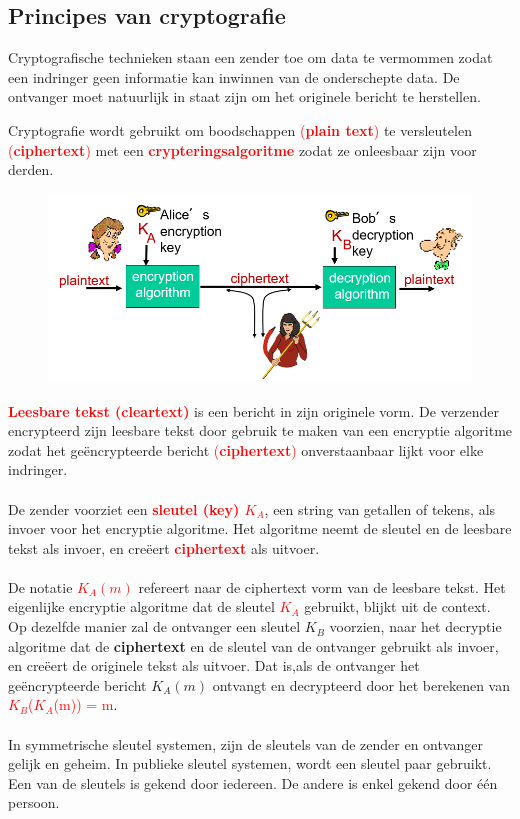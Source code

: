 \subsection{Principes van cryptografie}
Cryptografische technieken staan een zender toe om data te vermommen zodat een indringer geen informatie kan inwinnen van de onderschepte data. De ontvanger moet natuurlijk in staat zijn om het originele bericht te herstellen.

\noindent Cryptografie wordt gebruikt om boodschappen \textcolor{red}{(\textbf{plain text})} te versleutelen \textcolor{red}{(\textbf{ciphertext})} met een \textcolor{red}{\textbf{crypteringsalgoritme}} zodat ze onleesbaar zijn voor derden.

\begin{figure}[h]
    \centering
    \includegraphics[width=7in]{./img/imghfdst8/hfdst8puntje2.png}\\[1cm]
    \caption{ }      
    \label{fig: }
\end{figure}

\noindent \textcolor{red}{\textbf{Leesbare tekst (cleartext)}} is een bericht in zijn originele vorm. De verzender encrypteerd zijn leesbare tekst door gebruik te maken van een encryptie algoritme zodat het geëncrypteerde bericht \textcolor{red}{(\textbf{ciphertext})} onverstaanbaar lijkt voor elke indringer. 
\\\\
De zender voorziet een \textcolor{red}{\textbf{sleutel (key) $K_A$}}, een string van getallen of tekens, als invoer voor het encryptie algoritme. Het algoritme neemt de sleutel en de leesbare tekst als invoer, en creëert \textcolor{red}{\textbf{ciphertext}} als uitvoer.
\\\\
De notatie \textcolor{red}{$K_A (m)$} refereert naar de ciphertext vorm van de leesbare tekst. Het eigenlijke encryptie algoritme dat de sleutel \textcolor{red}{$K_A $} gebruikt, blijkt uit de context.
Op dezelfde manier zal de ontvanger een sleutel $K_B$ voorzien, naar het decryptie algoritme dat de \textbf{ciphertext} en de sleutel van de ontvanger gebruikt als invoer, en creëert de originele tekst als uitvoer.
Dat is,als de ontvanger het geëncrypteerde bericht $K_A (m) $ ontvangt en decrypteerd door het berekenen van \textcolor{red}{$K_B$($K_A$(m)) = m}.
\\\\
In symmetrische sleutel systemen, zijn de sleutels van de zender en ontvanger gelijk en geheim.
In publieke sleutel systemen, wordt een sleutel paar gebruikt. Een van de sleutels is gekend door iedereen. De andere is enkel gekend door één persoon.

